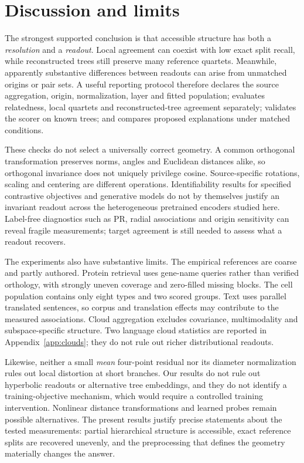 \documentclass[mlmain]{jmlr}
\begin{document}
\section{Discussion and limits}
\label{sec:discussion}

The strongest supported conclusion is that accessible structure has both a \emph{resolution} and
a \emph{readout}. Local agreement can coexist with low exact split recall, while reconstructed
trees still preserve many reference quartets. Meanwhile, apparently substantive differences between
readouts can arise from unmatched origins or pair sets. A useful reporting protocol therefore
declares the source aggregation, origin, normalization, layer and fitted population; evaluates
relatedness, local quartets and reconstructed-tree agreement separately; validates the scorer on
known trees; and compares proposed explanations under matched conditions.

These checks do not select a universally correct geometry. A common orthogonal transformation
preserves norms, angles and Euclidean distances alike, so orthogonal invariance does not uniquely
privilege cosine. Source-specific rotations, scaling and centering are different operations.
Identifiability results for specified contrastive objectives and generative models
\citep{zimmermann2021contrastive} do not by themselves justify an invariant readout across the
heterogeneous pretrained encoders studied here. Label-free diagnostics such as PR, radial
associations and origin sensitivity can reveal fragile measurements; target agreement is still
needed to assess what a readout recovers.

The experiments also have substantive limits. The empirical references are coarse and partly
authored. Protein retrieval uses gene-name queries rather than verified orthology, with strongly
uneven coverage and zero-filled missing blocks. The cell population contains only eight types and
two scored groups. Text uses parallel translated sentences, so corpus and translation effects may
contribute to the measured associations. Cloud aggregation excludes covariance, multimodality and
subspace-specific structure. Two language cloud statistics are reported in
Appendix~\ref{app:clouds}; they do not rule out richer distributional readouts.

Likewise, neither a small \emph{mean} four-point residual nor its diameter normalization rules out
local distortion at short branches. Our results do not rule out hyperbolic readouts or alternative
tree embeddings, and they do not identify a training-objective mechanism, which would require a
controlled training intervention. Nonlinear distance transformations and learned probes remain possible
alternatives. The present results justify precise statements about the tested measurements:
partial hierarchical structure is accessible, exact reference splits are recovered unevenly,
and the preprocessing that defines the geometry materially changes the answer.
\end{document}
